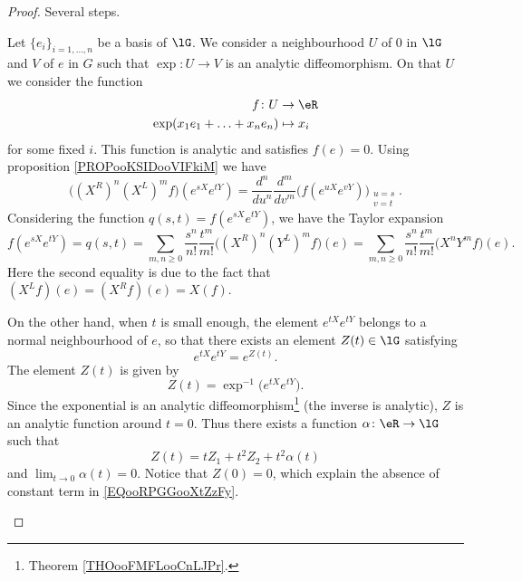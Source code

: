 \begin{proof}
	Several steps.
	\begin{subproof}

		Let \( \{ e_i \}_{i=1,\ldots, n}\) be a basis of \( \lG\). We consider a neighbourhood \( U\) of \( 0\) in \( \lG\) and \( V\) of \( e\) in \( G\) such that \( \exp\colon U\to V\) is an analytic diffeomorphism. On that \( U\) we consider the function
		\begin{equation}
			\begin{aligned}
				f\colon U                   & \to \eR     \\
				\exp(x_1e_1+\ldots +x_ne_n) & \mapsto x_i
			\end{aligned}
		\end{equation}
		for some fixed \( i\). This function is analytic and satisfies \( f(e)=0\).
		Using proposition \ref{PROPooKSIDooVIFkiM} we have
		\begin{equation}
			\big( (X^R)^n(X^L)^mf \big)( e^{sX} e^{tY})=\frac{ d^n }{ du^n }\frac{ d^m }{ dv^m }\big( f( e^{uX} e^{vY}) \big)_{\substack{u=s\\v=t}}.
		\end{equation}
		Considering the function \( q(s,t)=f( e^{sX} e^{tY})\), we have the Taylor expansion
		\begin{equation}        \label{EQooNBOIooRxlZmP}
			f( e^{sX} e^{tY})=q(s,t)=\sum_{m,n\geq 0}\frac{ s^n }{ n! }\frac{ t^m }{ m! }\big( (X^R)^n(Y^L)^mf \big)(e)=\sum_{m,n\geq 0}\frac{ s^n }{ n! }\frac{ t^m }{ m! }\big( X^nY^mf \big)(e).
		\end{equation}
		Here the second equality is due to the fact that \( (X^Lf)(e)=(X^Rf)(e)=X(f)\).


		On the other hand, when \( t\) is small enough, the element \(  e^{tX} e^{tY}\) belongs to a normal neighbourhood of \( e\), so that there exists an element \( Z(t)\in \lG\) satisfying
		\begin{equation}
			e^{tX} e^{tY}= e^{Z(t)}.
		\end{equation}
		The element \( Z(t)\) is given by
		\begin{equation}
			Z(t)=\exp^{-1}\big(  e^{tX} e^{tY} \big).
		\end{equation}
		Since the exponential is an analytic diffeomorphism\footnote{Theorem \ref{THOooFMFLooCnLJPr}.} (the inverse is analytic), \( Z\) is an analytic function around \( t=0\). Thus there exists a function \( \alpha\colon \eR\to \lG\) such that
		\begin{equation}        \label{EQooRPGGooXtZzFy}
			Z(t)=tZ_1+t^2Z_2+t^2\alpha(t)
		\end{equation}
		and \( \lim_{t\to 0} \alpha(t)=0\). Notice that \( Z(0)=0\), which explain the absence of constant term in \eqref{EQooRPGGooXtZzFy}.


\end{subproof}
\end{proof}
